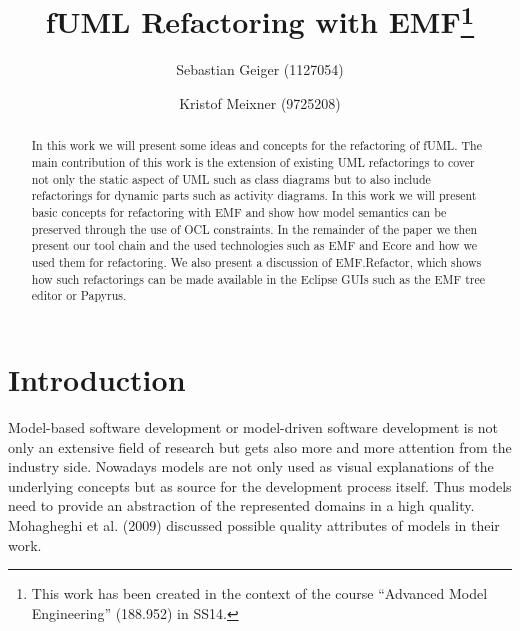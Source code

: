 \documentclass{llncs}
\begin{document}
\pagestyle{plain}

\title{fUML Refactoring with EMF\footnote{This work has been created in the context of the course ``Advanced Model Engineering'' (188.952) in SS14.}}

\author{Sebastian Geiger (1127054) \and Kristof Meixner (9725208)}

\maketitle

\begin{abstract}
In this work we will present some ideas and concepts for the refactoring of fUML. The main contribution of this work is the extension of
existing UML refactorings to cover not only the static aspect of UML such as class diagrams but to also include refactorings for dynamic
parts such as activity diagrams. In this work we will present basic concepts for refactoring with EMF and show how model semantics can be
preserved through the use of OCL constraints. In the remainder of the paper we then present our tool chain and the used technologies
such as EMF and Ecore and how we used them for refactoring. We also present a discussion of EMF.Refactor, which shows how such refactorings
can be made available in the Eclipse GUIs such as the EMF tree editor or Papyrus.
\end{abstract}

\tableofcontents
\newpage


\section{Introduction}

Model-based software development or model-driven software development is not only an extensive field of research but
gets also more and more attention from the industry side. Nowadays models are not only used as visual explanations of
the underlying concepts but as source for the development process itself. Thus models need to provide an abstraction of
the represented domains in a high quality. Mohagheghi et al. (2009)  discussed possible quality attributes of
models in their work.
\end{document}
